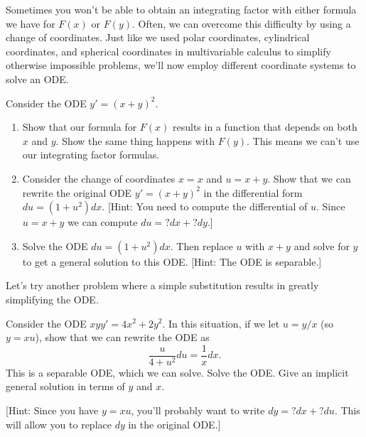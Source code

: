 Sometimes you won't be able to obtain an integrating factor with either formula we have for $F(x)$ or $F(y)$. 
Often, we can overcome this difficulty by using a change of coordinates. Just like we used polar coordinates, cylindrical coordinates, and spherical coordinates in multivariable calculus to simplify otherwise impossible problems, we'll now employ different coordinate systems to solve an ODE.

\begin{problem}
 Consider the ODE $y'=(x+y)^2$.  
\begin{enumerate}
 \item Show that our formula for $F(x)$ results in a function that depends on both $x$ and $y$. Show the same thing happens with $F(y)$.  This means we can't use our integrating factor formulas.
 \item Consider the change of coordinates $x=x$ and $u=x+y$. Show that we can rewrite the original ODE $y'=(x+y)^2$ in the differential form $du=(1+u^2)dx$. 
[Hint:  You need to compute the differential of $u$.  Since $u=x+y$ we can compute $du=?dx+?dy$.]
 \item 
{}%
Solve the ODE $du=(1+u^2)dx$.  Then replace $u$ with $x+y$ and solve for $y$ to get a general solution to this ODE. [Hint: The ODE is separable.]
\end{enumerate}
\end{problem}

Let's try another problem where a simple substitution results in greatly simplifying the ODE.
  

\begin{problem}
 Consider the ODE $xy y' = 4x^2+2y^2$.  
In this situation, if we let $u=y/x$ (so $y=xu$), show that we can rewrite the ODE as 
$$\frac{u}{4+u^2}du = \frac{1}{x}dx.$$  This is a separable ODE, which we can solve.  Solve the ODE. 
Give an implicit general solution in terms of $y$ and $x$. 

[Hint: Since you have $y=xu$, you'll probably want to write $dy = ?dx+?du$.  This will allow you to replace $dy$ in the original ODE.]
\end{problem}

